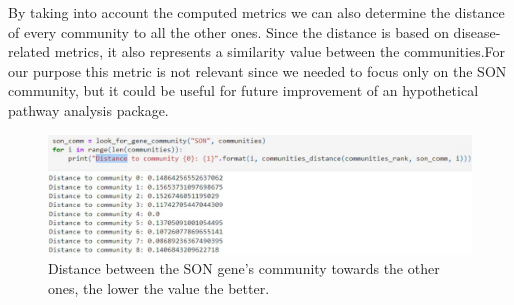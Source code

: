 By taking into account the computed metrics we can also determine the distance of every community to all the other ones. Since the distance is based on disease-related metrics, it also represents a similarity value between the communities.For our purpose this metric is not relevant since we needed to focus only on the SON community, but it could be useful for future improvement of an hypothetical pathway analysis package.
\begin{figure}[H]
    \centering
    \includegraphics[width=0.8\linewidth]{images/distance_communities.jpg}
    \caption{Distance between the SON gene's community towards the other ones, the lower the value the better.}
    \label{fig:distance_communities}
\end{figure}